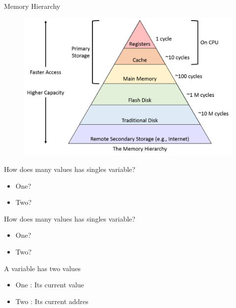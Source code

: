 \documentclass[10pt]{beamer}
\begin{document}
\begin{frame}{Memory Hierarchy}
  \begin{figure}[h]
    \centering
    \includegraphics[width=1.0\textwidth]{figures/MemoryHerarchy.png}
    \label{fig:MemoryHerarchy}
  \end{figure}
\end{frame}

\begin{frame}{How does many values has singles variable?}
  \begin{itemize}
    \item One?
    \item Two?
  \end{itemize}
\end{frame}\begin{frame}{How does many values has singles variable?}
  \begin{itemize}
    \item One?
    \item Two?
  \end{itemize}
\end{frame}

\begin{frame}{A variable has two values}
  \begin{itemize}
    \item One : Its current value 
    \item Two : Its current addres
  \end{itemize}
\end{frame}
\end{document}
